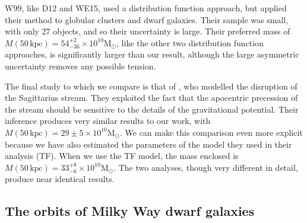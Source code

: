 \documentclass[useAMS,twocolumn,usenatbib]{mn2e}
\def\kpc{{\,\mathrm{kpc}}}
\begin{document}
W99, like D12 and WE15, used a distribution function approach, but applied their method to globular clusters 
and dwarf galaxies. Their sample was small, with only 27 objects, and so their uncertainty is large. Their 
preferred mass of $M(50\kpc)=54^{+2}_{-36}\times 10^{10}\mathrm{M}_\odot$, like the other two distribution 
function approaches, is significantly larger than our result, although the large asymmetric uncertainty removes 
any possible tension.

The final study to which we compare is that of \citet[][G14]{Gi14}, who modelled the disruption of the 
Sagittarius stream. They exploited the fact that the apocentric precession of the stream should be sensitive 
to the details of the gravitational potential. Their inference produces very similar results to our work, 
with $M(50\kpc)=29\pm5\times 10^{10}\mathrm{M}_\odot$. We can make this comparison even more explicit because we 
have also estimated the parameters of the model they used in their analysis (TF). When we use the TF model, 
the mass enclosed is $M(50\kpc)=33^{+8}_{-6}\times 10^{10}\mathrm{M}_\odot$. The two analyses, though 
very different in detail, produce near identical results.

\subsection{The orbits of Milky Way dwarf galaxies}
\end{document}
